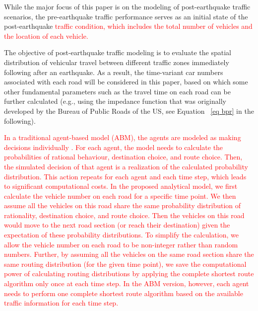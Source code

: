\documentclass[review,11pt,nonatbib]{elsarticle}
\begin{document}
While the major focus of this paper is on the modeling of post-earthquake traffic scenarios, the pre-earthquake traffic performance  serves as an initial state of the post-earthquake \textcolor{red}{ traffic condition, which includes the total number of vehicles and the location of each vehicle.}

\par The objective of post-earthquake traffic modeling is to evaluate the spatial distribution of vehicular travel between different traffic zones immediately following after an earthquake. As a result, the time-variant car numbers associated with each road will be considered in this paper, based on which some other fundamental parameters such as the travel time on each road can be further calculated (e.g., using the impedance function that was originally developed by the Bureau of Public Roads of the US, see Equation ~\eqref{eq bpr} in the following).

\par \textcolor{red}{In a traditional agent-based model (ABM), the agents are modeled as making decisions individually \citep{feng2017post}. For each agent, the model needs to calculate the probabilities of rational behaviour, destination choice, and route choice. Then, the simulated decision of that agent is a realization of the calculated probability distribution. This action repeats for each agent and each time step, which leads to significant  computational costs. In the proposed analytical model, we first calculate the vehicle number on each road for a specific time point. We then assume all the vehicles on this road share the same probability distribution of rationality, destination choice, and route choice. Then the vehicles on this road would move to the next road section (or reach their destination) given the expectation of these probability distributions. To simplify the calculation, we allow the vehicle number on each road to be non-integer rather than random numbers. Further, by assuming all the vehicles on the same road section share the same routing distribution (for the given time point), we save the computational power of calculating routing distributions by applying the complete shortest route algorithm only once at each time step. In the ABM version, however, each agent needs to perform one complete shortest route algorithm based on the available traffic information for each time step.}
\end{document}
